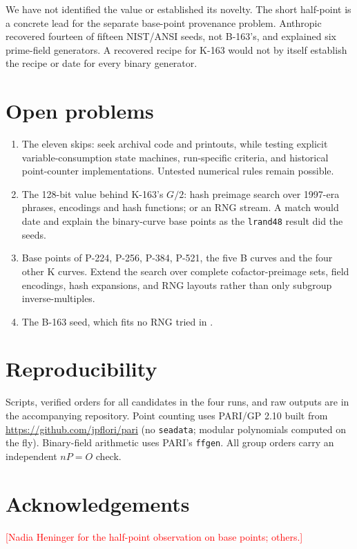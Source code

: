\documentclass[11pt]{article}
\newcommand{\lrand}{\texttt{lrand48}}
\newcommand{\todo}[1]{\textcolor{red}{[#1]}}
\begin{document}
We have not identified the value or established its novelty. The short half-point is a concrete lead for the separate base-point provenance problem. Anthropic recovered fourteen of fifteen NIST/ANSI seeds, not B-163's, and explained six prime-field generators. A recovered recipe for K-163 would not by itself establish the recipe or date for every binary generator.

\section{Open problems}\label{sec:open}
\begin{enumerate}
\item The eleven skips: seek archival code and printouts, while testing explicit variable-consumption state machines, run-specific criteria, and historical point-counter implementations. Untested numerical rules remain possible.
\item The 128-bit value behind K-163's $G/2$: hash preimage search over 1997-era phrases, encodings and hash functions; or an RNG stream. A match would date and explain the binary-curve base points as the \lrand{} result did the seeds.
\item Base points of P-224, P-256, P-384, P-521, the five B curves and the four other K curves. Extend the search over complete cofactor-preimage sets, field encodings, hash expansions, and RNG layouts rather than only subgroup inverse-multiples.
\item The B-163 seed, which fits no RNG tried in \cite{anthropic}.
\end{enumerate}

\section*{Reproducibility}
Scripts, verified orders for all candidates in the four runs, and raw outputs are in the accompanying repository. Point counting uses PARI/GP 2.10 built from \url{https://github.com/jpflori/pari} (no \texttt{seadata}; modular polynomials computed on the fly). Binary-field arithmetic uses PARI's \texttt{ffgen}. All group orders carry an independent $nP=O$ check.

\section*{Acknowledgements}
\todo{Nadia Heninger for the half-point observation on base points; others.}
\end{document}

